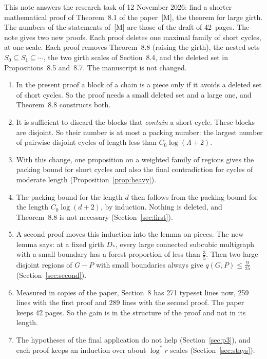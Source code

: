 \documentclass[11pt]{article}
\begin{document}
\maketitleblock

This note answers the research task of 12 November 2026: find a shorter mathematical proof of
Theorem~8.1 of the paper~[M], the theorem for large girth. The numbers of the statements of~[M]
are those of the draft of 42~pages. The note gives two new proofs. Each proof deletes one maximal
family of short cycles, at one scale. Each proof removes Theorem~8.8 (raising the girth), the
nested sets $S_0\subseteq S_1\subseteq\cdots$, the two girth scales of Section~8.4, and the
deleted set in Propositions~8.5 and~8.7. The manuscript is not changed.

\begin{enumerate}[leftmargin=1.6em]
\item In the present proof a block of a chain is a piece only if it avoids a deleted set of short
cycles. So the proof needs a small deleted set and a large one, and Theorem~8.8 constructs both.
\item It is sufficient to discard the blocks that \emph{contain} a short cycle. These blocks are
disjoint. So their number is at most a packing number: the largest number of pairwise disjoint
cycles of length less than $C_0\log(\Lambda+2)$.
\item With this change, one proposition on a weighted family of regions gives the packing bound
for short cycles and also the final contradiction for cycles of moderate length
(Proposition~\ref{prop:heavy}).
\item The packing bound for the length $d$ then follows from the packing bound for the length
$C_0\log(d+2)$, by induction. Nothing is deleted, and Theorem~8.8 is not necessary
(Section~\ref{sec:first}).
\item A second proof moves this induction into the lemma on pieces. The new lemma says: at a
fixed girth $D_*$, every large connected subcubic multigraph with a small boundary has a forest
proportion of less than $\frac35$. Then two large disjoint regions of $G-P$ with small boundaries
always give $q(G,P)\le\frac9{25}$ (Section~\ref{sec:second}).
\item Measured in copies of the paper, Section~8 has 271 typeset lines now, 259 lines with the
first proof and 289 lines with the second proof. The paper keeps 42 pages. So the gain is in the
structure of the proof and not in its length.
\item The hypotheses of the final application do not help (Section~\ref{sec:p3}), and each
proof keeps an induction over about $\log^{*}r$ scales (Section~\ref{sec:stays}).
\end{enumerate}
\end{document}
